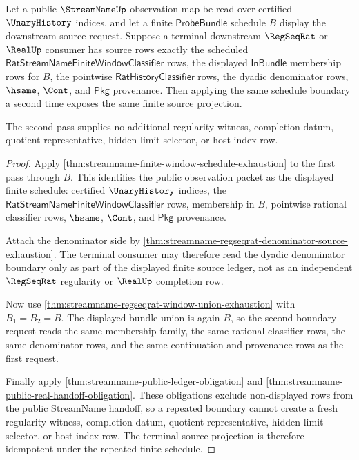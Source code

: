 \begin{theorem}
\label{thm:streamname-finite-window-terminal-schedule-idempotence}
Let a public $\StreamNameUp$ observation map be read over certified
$\UnaryHistory$ indices, and let a finite $\mathsf{ProbeBundle}$ schedule
$B$ display the downstream source request. Suppose a terminal downstream
$\RegSeqRat$ or $\RealUp$ consumer has source rows exactly the scheduled
$\mathsf{RatStreamNameFiniteWindowClassifier}$ rows, the displayed
$\mathsf{InBundle}$ membership rows for $B$, the pointwise
$\mathsf{RatHistoryClassifier}$ rows, the dyadic denominator rows, $\hsame$,
$\Cont$, and $\mathsf{Pkg}$ provenance. Then applying the same schedule
boundary a second time exposes the same finite source projection.

The second pass supplies no additional regularity witness, completion datum,
quotient representative, hidden limit selector, or host index row.
\end{theorem}
\begin{proof}
Apply \autoref{thm:streamname-finite-window-schedule-exhaustion} to the
first pass through $B$. This identifies the public observation packet as the
displayed finite schedule: certified $\UnaryHistory$ indices, the
$\mathsf{RatStreamNameFiniteWindowClassifier}$ rows, membership in $B$,
pointwise rational classifier rows, $\hsame$, $\Cont$, and $\mathsf{Pkg}$
provenance.

Attach the denominator side by
\autoref{thm:streamname-regseqrat-denominator-source-exhaustion}. The
terminal consumer may therefore read the dyadic denominator boundary only as
part of the displayed finite source ledger, not as an independent
$\RegSeqRat$ regularity or $\RealUp$ completion row.

Now use \autoref{thm:streamname-regseqrat-window-union-exhaustion} with
$B_1=B_2=B$. The displayed bundle union is again $B$, so the second boundary
request reads the same membership family, the same rational classifier rows,
the same denominator rows, and the same continuation and provenance rows as
the first request.

Finally apply \autoref{thm:streamname-public-ledger-obligation} and
\autoref{thm:streamname-public-real-handoff-obligation}. These obligations
exclude non-displayed rows from the public StreamName handoff, so a repeated
boundary cannot create a fresh regularity witness, completion datum, quotient
representative, hidden limit selector, or host index row. The terminal source
projection is therefore idempotent under the repeated finite schedule.
\end{proof}

